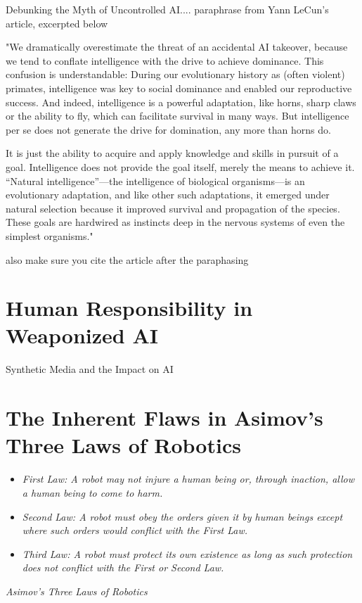 Debunking the Myth of Uncontrolled AI.... paraphrase from Yann LeCun's article, excerpted below

"We dramatically overestimate the threat of an accidental AI takeover, because we tend to conflate intelligence with the drive to achieve dominance. This confusion is understandable: During our evolutionary history as (often violent) primates, intelligence was key to social dominance and enabled our reproductive success. And indeed, intelligence is a powerful adaptation, like horns, sharp claws or the ability to fly, which can facilitate survival in many ways. But intelligence per se does not generate the drive for domination, any more than horns do.

It is just the ability to acquire and apply knowledge and skills in pursuit of a goal. Intelligence does not provide the goal itself, merely the means to achieve it. “Natural intelligence”—the intelligence of biological organisms—is an evolutionary adaptation, and like other such adaptations, it emerged under natural selection because it improved survival and propagation of the species. These goals are hardwired as instincts deep in the nervous systems of even the simplest organisms."

also make sure you cite the article after the paraphasing \cite{dontfearterminator}

\section{Human Responsibility in Weaponized AI}

Synthetic Media and the Impact on AI \cite{syntheticmedia}

\section{The Inherent Flaws in Asimov's Three Laws of Robotics}

\begin{itemize}
    \item\textit{First Law: A robot may not injure a human being or, through inaction, allow a human being to come to harm.}
    \item\textit{Second Law: A robot must obey the orders given it by human beings except where such orders would conflict with the First Law.}
    \item\textit{Third Law: A robot must protect its own existence as long as such protection does not conflict with the First or Second Law.}
\end{itemize} 
\textit{Asimov's Three Laws of Robotics}

